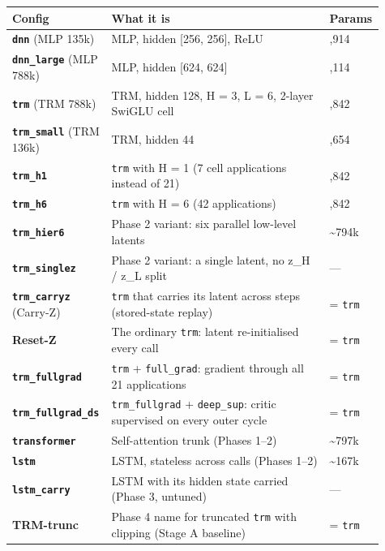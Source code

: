 \documentclass[11pt]{article}
\begin{document}
\begin{center}\small\begin{tabular}{>{\raggedright\arraybackslash}p{0.237\linewidth}>{\raggedright\arraybackslash}p{0.586\linewidth}>{\raggedleft\arraybackslash}p{0.083\linewidth}}
\toprule
Config & What it is & Params \\
\midrule
\textbf{\texttt{dnn}} (MLP 135k) & MLP, hidden [256, 256], ReLU & 134,914 \\
\textbf{\texttt{dnn\_large}} (MLP 788k) & MLP, hidden [624, 624] & 788,114 \\
\textbf{\texttt{trm}} (TRM 788k) & TRM, hidden 128, H = 3, L = 6, 2-layer SwiGLU cell & 787,842 \\
\textbf{\texttt{trm\_small}} (TRM 136k) & TRM, hidden 44 & 135,654 \\
\textbf{\texttt{trm\_h1}} & \texttt{trm} with H = 1 (7 cell applications instead of 21) & 787,842 \\
\textbf{\texttt{trm\_h6}} & \texttt{trm} with H = 6 (42 applications) & 787,842 \\
\textbf{\texttt{trm\_hier6}} & Phase 2 variant: six parallel low-level latents & \textasciitilde{}794k \\
\textbf{\texttt{trm\_singlez}} & Phase 2 variant: a single latent, no z\_H / z\_L split & --- \\
\textbf{\texttt{trm\_carryz}} (Carry-Z) & \texttt{trm} that carries its latent across steps (stored-state replay) & = \texttt{trm} \\
\textbf{Reset-Z} & The ordinary \texttt{trm}: latent re-initialised every call & = \texttt{trm} \\
\textbf{\texttt{trm\_fullgrad}} & \texttt{trm} + \texttt{full\_grad}: gradient through all 21 applications & = \texttt{trm} \\
\textbf{\texttt{trm\_\allowbreak{}fullgrad\_\allowbreak{}ds}} & \texttt{trm\_fullgrad} + \texttt{deep\_sup}: critic supervised on every outer cycle & = \texttt{trm} \\
\textbf{\texttt{transformer}} & Self-attention trunk (Phases 1--2) & \textasciitilde{}797k \\
\textbf{\texttt{lstm}} & LSTM, stateless across calls (Phases 1--2) & \textasciitilde{}167k \\
\textbf{\texttt{lstm\_carry}} & LSTM with its hidden state carried (Phase 3, untuned) & --- \\
\textbf{TRM-trunc} & Phase 4 name for truncated \texttt{trm} with clipping (Stage A baseline) & = \texttt{trm} \\
\bottomrule
\end{tabular}\end{center}
\end{document}
